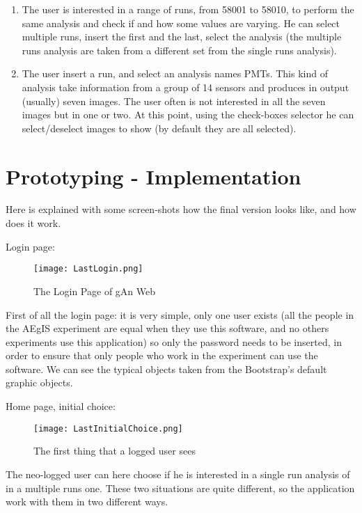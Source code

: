 \begin{enumerate}
\item
The user is interested in a range of runs, from 58001 to 58010, to perform the same analysis and check if and how some values are varying. He can select multiple runs, insert the first and the last, select the analysis (the multiple runs analysis are taken from a different set from the single runs analysis).

\item
The user insert a run, and select an analysis names PMTs. This kind of analysis take information from a group of 14 sensors and produces in output (usually) seven images. The user often is not interested in all the seven images but in one or two. At this point, using the check-boxes selector he can select/deselect images to show (by default they are all selected).  

\end{enumerate}

\section{Prototyping - Implementation}

Here is explained with some screen-shots how the final version looks like, and how does it work.

Login page:


\begin{figure}[H]
\centering
\texttt{[image: LastLogin.png]} 
\caption{The Login Page of gAn Web}
\end{figure}

First of all the login page: it is very simple, only one user exists (all the people in the AEgIS experiment are equal when they use this software, and no others experiments use this application) so only the password needs to be inserted, in order to ensure that only people who work in the experiment can use the software. We can see the typical objects taken from the Bootstrap's default graphic objects.


Home page, initial choice:

\begin{figure}[H]
\centering
\texttt{[image: LastInitialChoice.png]} 
\caption{The first thing that a logged user sees}
\end{figure}
  
The neo-logged user can here choose if he is interested in a single run analysis of in a multiple runs one. These two situations are quite different, so the application work with them in two different ways.


